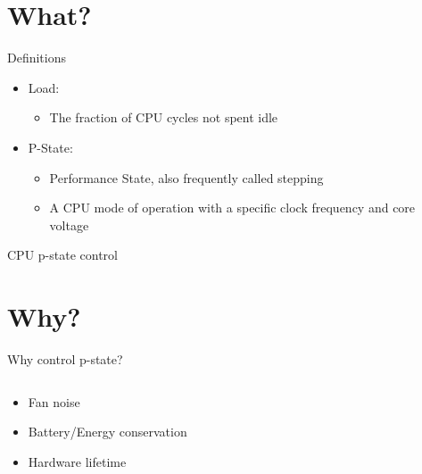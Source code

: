 \documentclass[aspectratio=169]{beamer}
\begin{document}
\section{What?}

\begin{frame}{Definitions}
\begin{itemize}
\item Load: \begin{itemize}
      \item<2-> The fraction of CPU cycles not spent idle
      \end{itemize}
\item<3-> P-State: \begin{itemize}
      \item<4-> Performance State, also frequently called stepping
      \item<5-> A CPU mode of operation with a specific clock frequency
                and core voltage
      \end{itemize}
\end{itemize}
\end{frame}

\begin{frame}{CPU p-state control}
\centering
{}
\end{frame}

\section{Why?}

\begin{frame}{Why control p-state?}
\begin{columns}[onlytextwidth]
\begin{column}{0.4\textwidth}
\begin{itemize}
\item<1-> Fan noise
\item<2-> Battery/Energy conservation
\item<3-> Hardware lifetime
\end{itemize}
\end{column}
\begin{column}{0.6\textwidth}
\begin{tikzpicture}[scale=.6]


\end{tikzpicture}
\end{column}
\end{columns}
\end{frame}
\end{document}
